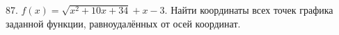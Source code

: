 87. $f(x)=\sqrt{x^2+10x+34}+x-3.$ Найти координаты всех точек графика заданной функции,
равноудалённых от осей координат.\\
